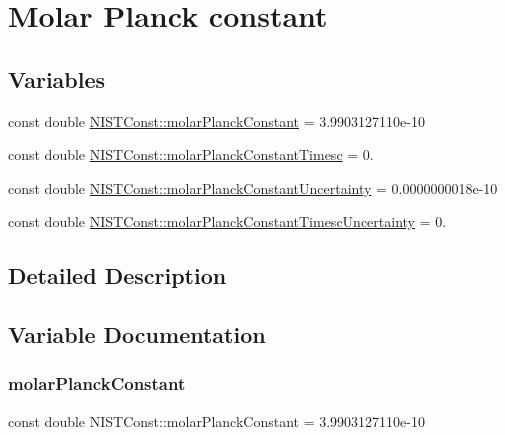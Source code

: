 \hypertarget{group___molar_planck_constant}{}\section{Molar Planck constant}
\label{group___molar_planck_constant}
\subsection*{Variables}
\begin{DoxyCompactItemize}
\item 
const double \hyperlink{group___molar_planck_constant_gaf75c23aa4c9305b0670bc8162fa25b66}{N\+I\+S\+T\+Const\+::molar\+Planck\+Constant} = 3.\+9903127110e-\/10
\item 
const double \hyperlink{group___molar_planck_constant_ga4ead25403deaa41d6f95b1252140b8b0}{N\+I\+S\+T\+Const\+::molar\+Planck\+Constant\+Timesc} = 0.
\item 
const double \hyperlink{group___molar_planck_constant_ga7634e99b3b26690645162c46aa910ee8}{N\+I\+S\+T\+Const\+::molar\+Planck\+Constant\+Uncertainty} = 0.\+0000000018e-\/10
\item 
const double \hyperlink{group___molar_planck_constant_ga933b4c46e23c5f1f1380f3dc21299ad6}{N\+I\+S\+T\+Const\+::molar\+Planck\+Constant\+Timesc\+Uncertainty} = 0.
\end{DoxyCompactItemize}


\subsection{Detailed Description}


\subsection{Variable Documentation}
\mbox{\label{group___molar_planck_constant_gaf75c23aa4c9305b0670bc8162fa25b66}} 
\subsubsection{\texorpdfstring{molar\+Planck\+Constant}{molarPlanckConstant}}
{\footnotesize\ttfamily const double N\+I\+S\+T\+Const\+::molar\+Planck\+Constant = 3.\+9903127110e-\/10}

